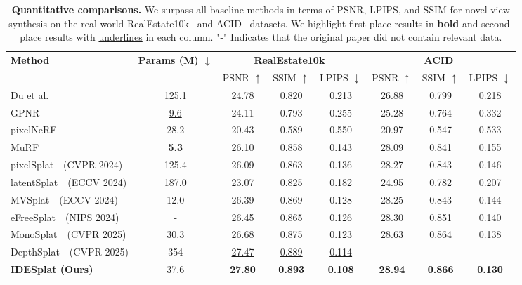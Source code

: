 \begin{table}[t]
\normalsize
\centering

\caption{
\textbf{Quantitative comparisons.} We surpass all baseline methods in terms of PSNR, LPIPS, and SSIM for novel view synthesis on the real-world RealEstate10k~\cite{DBLP:journals/tog/ZhouTFFS18} and ACID~\cite{liu2021infinite} datasets. We highlight first-place results in \textbf{bold} and second-place results with \underline{underlines} in each column. "-" Indicates that the original paper did not contain relevant data.}
\begin{tabular}{l|c|ccc|ccc}
\toprule

\multirow{2}{*}{\textbf{Method}} & \multirow{2}{*}{\textbf{Params (M) $\downarrow$}} & \multicolumn{3}{c|}{\textbf{RealEstate10k~\cite{DBLP:journals/tog/ZhouTFFS18}}} & \multicolumn{3}{c}{\textbf{ACID~\cite{liu2021infinite}}}    \\

&   &  PSNR $\uparrow$ & SSIM $\uparrow$ & LPIPS $\downarrow$ & PSNR $\uparrow$ & SSIM $\uparrow$ & LPIPS $\downarrow$\\

\midrule
Du et al.\cite{du2023learning}            & 125.1           & 24.78 & 0.820 & 0.213 & 26.88 & 0.799 & 0.218  \\
GPNR\cite{suhail2022generalizable}        & \underline{9.6} & 24.11 & 0.793 & 0.255 & 25.28 & 0.764 & 0.332  \\
pixelNeRF~\cite{yu2021pixelnerf}          & 28.2            & 20.43 & 0.589 & 0.550 & 20.97 & 0.547 & 0.533  \\
MuRF~\cite{xu2024murf}                    & \textbf{5.3}    & 26.10 & 0.858 & 0.143 & 28.09 & 0.841 & 0.155  \\
\midrule
pixelSplat~\cite{charatan2024pixelsplat}~(CVPR 2024)  & 125.4           & 26.09 & 0.863 & 0.136 & 28.27 & 0.843 & 0.146   \\
latentSplat~\cite{wewer2024latentsplat}~(ECCV 2024)   & 187.0           & 23.07 & 0.825 & 0.182 & 24.95 & 0.782 & 0.207   \\
MVSplat~\cite{chen2024mvsplat}~(ECCV 2024)            & 12.0            & 26.39 & {0.869} & 0.128 & 28.25 & 0.843 & 0.144  \\
eFreeSplat~\cite{min2024epipolar}~(NIPS 2024)         & -             & 26.45 & 0.865 & {0.126} & {28.30} & {0.851} & {0.140}  \\
MonoSplat~\cite{liu2025monosplat}~(CVPR 2025)         & 30.3            & {26.68} & {0.875} & {0.123} & \underline{28.63} & \underline{0.864} & \underline{0.138}  \\
DepthSplat~\cite{xu2025depthsplat}~(CVPR 2025)        & 354             & \underline{27.47} & \underline{0.889} & \underline{0.114} & {-} & {-} & {-}  \\
\rowcolor{row_color}
\textbf{IDESplat (Ours)}                  & 37.6            & \textbf{27.80} & \textbf{0.893} & \textbf{0.108} & \textbf{28.94} & \textbf{0.866} & \textbf{0.130}  \\
\bottomrule
\end{tabular}


\end{table}
